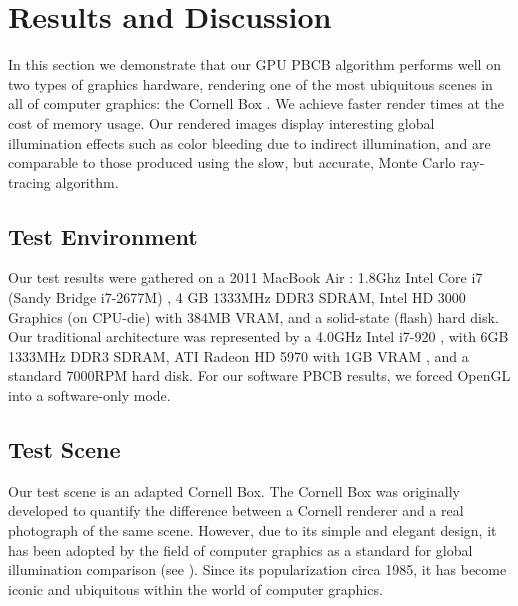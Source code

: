 \chapter{Results and Discussion}
\label{ch:results}
In this section we demonstrate that our GPU PBCB algorithm performs well on two types of graphics hardware, rendering one of the most ubiquitous scenes in all of computer graphics: the Cornell Box \cite{bib:cornell_box}. We achieve faster render times at the cost of memory usage. Our rendered images display interesting global illumination effects such as color bleeding due to indirect illumination, and are comparable to those produced using the slow, but accurate, Monte Carlo ray-tracing algorithm.

\section{Test Environment}
Our test results were gathered on a 2011 MacBook Air \cite{bib:mba}: 1.8Ghz Intel Core i7 (Sandy Bridge i7-2677M) \cite{bib:sandy_bridge}, 4 GB 1333MHz DDR3 SDRAM, Intel HD 3000 Graphics (on CPU-die) with 384MB VRAM, and a solid-state (flash) hard disk. Our traditional architecture was represented by a 4.0GHz Intel i7-920 \cite{bib:i7-920}, with 6GB 1333MHz DDR3 SDRAM, ATI Radeon HD 5970 with 1GB VRAM \cite{bib:ati5870}, and a standard 7000RPM hard disk. For our software PBCB results, we forced OpenGL into a software-only mode.

\section{Test Scene}
Our test scene is an adapted Cornell Box. The Cornell Box was originally developed to quantify the difference between a Cornell renderer \cite{bib:cornell_box} and a real photograph of the same scene. However, due to its simple and elegant design, it has been adopted by the field of computer graphics as a standard for global illumination comparison (see \cite{bib:cornell_box_reference1, bib:cornell_box_reference3, bib:cornell_box_reference4, bib:cornell_box_reference2}). Since its popularization circa 1985, it has become iconic and ubiquitous within the world of computer graphics.

